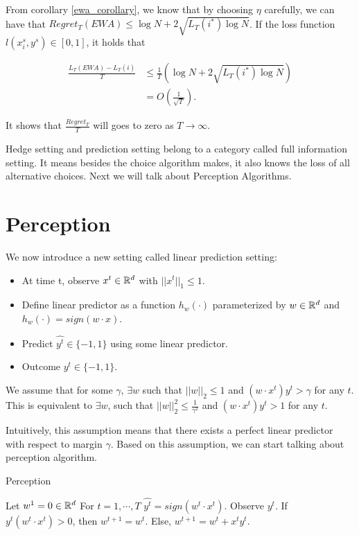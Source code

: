 \documentclass[../main.tex]{subfiles}
\begin{document}
From corollary \ref{ewa_corollary}, we know that by choosing $\eta$ carefully, we can have that $Regret_T(EWA) \leq \log N + 2 \sqrt{L_T(i^*) \log N}$. If the loss function $l(x_i^s, y^s) \in [0,1]$, it holds that

\begin{equation*}
\begin{aligned}
\frac{L_T(EWA) - L_T(i)}{T} & \leq \frac{1}{T} (\log N + 2 \sqrt{L_T(i^*) \log N}) \\
& = O(\frac{1}{\sqrt{T}}).
\end{aligned}
\end{equation*}

It shows that $\frac{Regret_T }{T}$ will goes to zero as $T \to \infty$. 

Hedge setting and prediction setting belong to a category called full information setting. It means besides the choice algorithm makes, it also knows the loss of all alternative choices. Next we will talk about Perception Algorithms.

\section{Perception}

We now introduce a new setting called linear prediction setting:

\begin{itemize}
	\item At time t, observe $x^t \in \mathbb{R}^d$ with $||x^t||_1 \leq 1$.
	\item Define linear predictor as a function $h_w(\cdot)$ parameterized by $w \in \mathbb{R}^d$ and $h_w(\cdot) = sign(w \cdot x)$.
	\item Predict $\hat{y^t} \in \{-1, 1\}$ using some linear predictor.
	\item Outcome $y^t \in \{-1, 1\}$.
\end{itemize}

We assume that for some $\gamma$, $\exists w$ such that $||w||_2 \leq 1$ and $(w\cdot x^t) y^t > \gamma$ for any $t$. This is equivalent to $\exists w$, such that $||w||^2_2 \leq \frac{1}{\gamma^2}$ and $(w\cdot x^t) y^t > 1$ for any $t$.

Intuitively, this assumption means that there exists a perfect linear predictor with respect to margin $\gamma$. Based on this assumption, we can start talking about perception algorithm.

\begin{algorithm}[H]
	\caption{Perception}
	\begin{algorithmic}
		\STATE Let $w^1 = 0 \in \mathbb{R}^d$
		\STATE For $t = 1,\cdots, T$
		\bindent
			\STATE $\hat{y^t} = sign(w^t \cdot x^t)$.
			\STATE Observe $y^t$.
			\STATE If $y^t(w^t\cdot x^t) >0$, then $w^{t+1} = w^t$.
			\STATE Else, $w^{t+1} = w^t + x^ty^t$.
		\eindent
	\end{algorithmic}
\end{algorithm}
\end{document}
